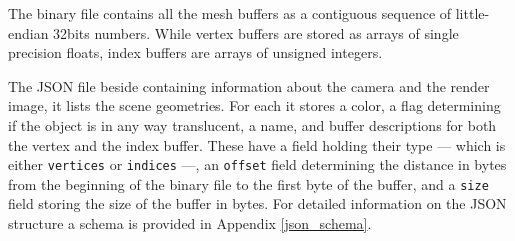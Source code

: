 The binary file contains all the mesh buffers as a contiguous sequence of little-endian 32bits numbers. While vertex buffers are stored as arrays of single precision floats, index buffers are arrays of unsigned integers. 

The JSON file beside containing information about the camera and the render image, it lists the scene geometries. For each it stores a color, a flag determining if the object is in any way translucent, a name, and buffer descriptions for both the vertex and the index buffer. These have a field holding their type --- which is either \texttt{vertices} or \texttt{indices} ---, an \texttt{offset} field determining the distance in bytes from the beginning of the binary file to the first byte of the buffer, and a \texttt{size} field storing the size of the buffer in bytes. For detailed information on the JSON structure a schema is provided in Appendix \ref{json_schema}.

